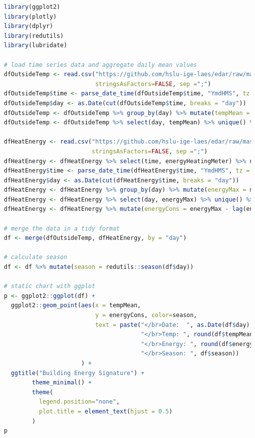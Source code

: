 \documentclass[
]{book}
\begin{document}
\begin{lstlisting}[language=R]
library(ggplot2)
library(plotly)
library(dplyr)
library(redutils)
library(lubridate)

# load time series data and aggregate daily mean values
dfOutsideTemp <- read.csv("https://github.com/hslu-ige-laes/edar/raw/master/sampleData/centralOutsideTemp.csv",
                          stringsAsFactors=FALSE, sep =";")
dfOutsideTemp$time <- parse_date_time(dfOutsideTemp$time, "YmdHMS", tz = "Europe/Zurich")
dfOutsideTemp$day <- as.Date(cut(dfOutsideTemp$time, breaks = "day"))
dfOutsideTemp <- dfOutsideTemp %>% group_by(day) %>% mutate(tempMean = mean(centralOutsideTemp)) %>% ungroup()
dfOutsideTemp <- dfOutsideTemp %>% select(day, tempMean) %>% unique() %>% na.omit()

dfHeatEnergy <- read.csv("https://github.com/hslu-ige-laes/edar/raw/master/sampleData/centralHeating.csv",
                         stringsAsFactors=FALSE, sep =";")
dfHeatEnergy <- dfHeatEnergy %>% select(time, energyHeatingMeter) %>% na.omit()
dfHeatEnergy$time <- parse_date_time(dfHeatEnergy$time, "YmdHMS", tz = "Europe/Zurich")
dfHeatEnergy$day <- as.Date(cut(dfHeatEnergy$time, breaks = "day"))
dfHeatEnergy <- dfHeatEnergy %>% group_by(day) %>% mutate(energyMax = max(energyHeatingMeter)) %>% ungroup()
dfHeatEnergy <- dfHeatEnergy %>% select(day, energyMax) %>% unique() %>% na.omit()
dfHeatEnergy <- dfHeatEnergy %>% mutate(energyCons = energyMax - lag(energyMax)) %>% select(-energyMax) %>% na.omit()

# merge the data in a tidy format
df <- merge(dfOutsideTemp, dfHeatEnergy, by = "day")

# calculate season
df <- df %>% mutate(season = redutils::season(df$day))

# static chart with ggplot
p <- ggplot2::ggplot(df) +
  ggplot2::geom_point(aes(x = tempMean,
                          y = energyCons, color=season,
                          text = paste("</br>Date:  ", as.Date(df$day),
                                       "</br>Temp: ", round(df$tempMean, digits = 1), "\u00B0C",
                                       "</br>Energy: ", round(df$energyCons, digits = 0), "kWh/d",
                                       "</br>Season: ", df$season))
                      ) +
  ggtitle("Building Energy Signature") +
        theme_minimal() +
        theme(
          legend.position="none",
          plot.title = element_text(hjust = 0.5)
        )
p
\end{lstlisting}
\end{document}

